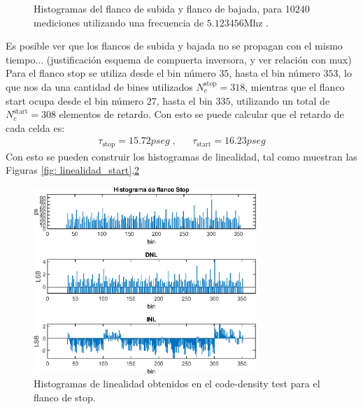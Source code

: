 \begin{figure}[H]
\begin{subfigure}{0.45\textwidth}
{           }
     \end{subfigure}
     \caption{Histogramas del flanco de subida y flanco de bajada, para 10240 mediciones
     utilizando una frecuencia de $5.123456$Mhz .}
     \label{fig: histogramas_magic}
\end{figure}%

Es posible ver que los flancos de subida y bajada no se propagan con el mismo tiempo... 
(justificación esquema de compuerta inversora, y ver relación con mux)\\

Para el flanco stop se utiliza desde el bin número $35$, hasta el bin número $353$, lo que nos
da una cantidad de bines utilizados $N_c^{\text{stop}} = 318$, mientras que el flanco start
ocupa desde el bin número $27$, hasta el bin $335$, utilizando un total de $N_c^{\text{start}} = 308$
elementos de retardo. Con esto se puede calcular que el retardo de cada celda es:
\begin{align}
     \tau_{\text{stop}} = 15.72pseg \; , && \tau_{\text{start}} = 16.23pseg
\end{align}
Con esto se pueden construir los histogramas de linealidad, tal como muestran las Figuras \ref{fig: linealidad_start},\ref{fig: linealidad_stop}

\begin{figure}[H]
      \centering
      \includegraphics[width=0.75\textwidth]{imagenes/linealidad_stop.eps}
      \caption{Histogramas de linealidad obtenidos en el code-density test para el flanco de stop.}
      \label{fig: linealidad_stop}
\end{figure}

